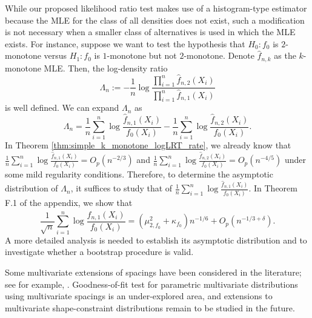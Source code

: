 \documentclass[12pt,letterpaper, twoside, openany]{article}
\theoremstyle{plain}
\begin{document}
%		
While our proposed likelihood ratio test makes use of a histogram-type estimator because the MLE for the class of all densities does not exist, such a modification is not necessary when a smaller class of alternatives is used in which the MLE exists. For instance, suppose we want to test the hypothesis that $H_0: f_0$ is $2$-monotone versus $H_1: f_0$ is $1$-monotone but not $2$-monotone. Denote $\hat{f}_{n,k}$ as the $k$-monotone MLE. Then, the log-density ratio
		\begin{equation*}
			\Lambda_{n} := - \frac{1}{n} \log \frac{ \prod^n_{i=1} \hat{f}_{n, 2}(X_i)}{\prod^n_{i=1} \hat{f}_{n, 1}(X_i) }
		\end{equation*}
		is well defined. We can expand $\Lambda_{n}$ as 
		\begin{equation*}
			\Lambda_{n} = \frac{1}{n} \sum^n_{i=1} \log \frac{\hat{f}_{n,1}(X_i)}{f_0(X_i)} - \frac{1}{n}\sum^n_{i=1} \log \frac{\hat{f}_{n,2}(X_i)}{f_0(X_i)}.
		\end{equation*}
    In Theorem \ref{thm:simple_k_monotone_logLRT_rate}, we already know that $\frac{1}{n} \sum^n_{i=1} \log \frac{\hat{f}_{n,1}(X_i)}{f_0(X_i)} = O_p(n^{-2/3})$ and $\frac{1}{n}\sum^n_{i=1} \log \frac{\hat{f}_{n,2}(X_i)}{f_0(X_i)} = O_p(n^{-4/5})$  under some mild regularity conditions. Therefore, to determine the asymptotic distribution of $\Lambda_{n}$,  it suffices to study that of $\frac{1}{n}\sum^n_{i=1} \log \frac{\hat{f}_{n,1}(X_i)}{f_0(X_i)}$. In  Theorem F.1 of the appendix, we show that
		\begin{equation*}
			\frac{1}{\sqrt{n}} \sum^n_{i=1} \log \frac{\hat{f}_{n,1}(X_i)}{f_0(X_i)} =  (\mu^2_{2, f_0} + \kappa_{f_0})n^{-1/6} + O_p(n^{-1/3 + \delta}).
		\end{equation*}
		A more detailed analysis is needed to establish its asymptotic distribution and to investigate whether a bootstrap procedure is valid.  

  Some multivariate extensions of spacings have been considered in the literature; see for example, \citep{deheuvels1983strong, zhou1993goodness, li2008multivariate}. Goodness-of-fit test for parametric multivariate distributions using multivariate spacings is an under-explored area, and extensions to multivariate shape-constraint distributions remain to be studied in the future.

\end{document}
